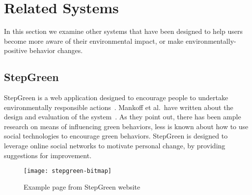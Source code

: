 \section{Related Systems}
\label{sec:related-systems}

In this section we examine other systems that have been designed to help users become more aware of their environmental impact, or make environmentally-positive behavior changes.


\subsection{StepGreen}
\label{sec:stepgreen}

StepGreen is a web application designed to encourage people to undertake environmentally responsible actions~\cite{step-green-website}. Mankoff et al.\ have written about the design and evaluation of the system~\cite{Mankoff2010}. As they point out, there has been ample research on means of influencing green behaviors, less is known about how to use social technologies to encourage green behaviors. StepGreen is designed to leverage online social networks to motivate personal change, by providing suggestions for improvement.

\begin{figure}[htbp]
	\centering
		\texttt{[image: stepgreen-bitmap]}
		\caption{Example page from StepGreen website}
		\label{fig:stepgreen-website}
\end{figure}

